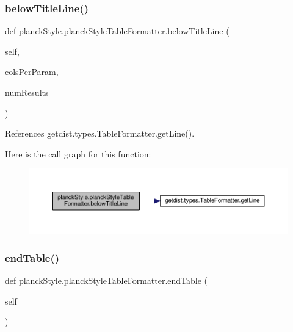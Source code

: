\subsubsection{\texorpdfstring{below\+Title\+Line()}{belowTitleLine()}}
{\footnotesize\ttfamily def planck\+Style.\+planck\+Style\+Table\+Formatter.\+below\+Title\+Line (\begin{DoxyParamCaption}\item[{}]{self,  }\item[{}]{cols\+Per\+Param,  }\item[{}]{num\+Results }\end{DoxyParamCaption})}



References getdist.\+types.\+Table\+Formatter.\+get\+Line().

Here is the call graph for this function\+:
\nopagebreak
\begin{figure}[H]
\begin{center}
\leavevmode
\includegraphics[width=350pt]{classplanckStyle_1_1planckStyleTableFormatter_aac368526501b5610660e0af83efc4b9d_cgraph}
\end{center}
\end{figure}
\mbox{\label{classplanckStyle_1_1planckStyleTableFormatter_a0960ddb101fe6bc34ce1051487daea3c}} 
\subsubsection{\texorpdfstring{end\+Table()}{endTable()}}
{\footnotesize\ttfamily def planck\+Style.\+planck\+Style\+Table\+Formatter.\+end\+Table (\begin{DoxyParamCaption}\item[{}]{self }\end{DoxyParamCaption})}



